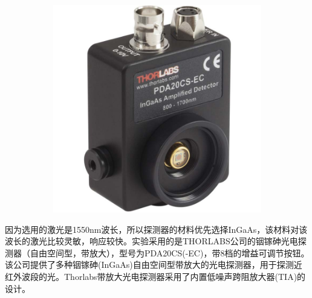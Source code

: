 \begin{figure}[!htbp]
\begin{subfigure}[c]{0.5\textwidth}
		\includegraphics[width=\textwidth]{./Img/PDA20CS-EC-PICTURE.jpg}
		\caption{}
		\label{PDA20CS-EC-PICTURE}
	\end{subfigure}

	\label{fig:PDA20CS}
\end{figure}

因为选用的激光是1550nm波长，所以探测器的材料优先选择InGaAs，该材料对该波长的激光比较灵敏，响应较快。实验采用的是THORLABS公司的铟镓砷光电探测器（自由空间型，带放大），型号为PDA20CS(-EC)，带8档的增益可调节按钮。该公司提供了多种铟镓砷(InGaAs)自由空间型带放大的光电探测器，用于探测近红外波段的光。Thorlabs带放大光电探测器采用了内置低噪声跨阻放大器(TIA)的设计。



